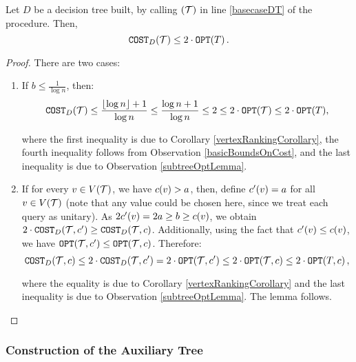 \begin{lemma}\label{baseOfRecursion}
    Let $D$ be a decision tree built, by calling \FRankingBasedDT$\mathopen{}\left( \mathcal{T} \right)$ in line \ref{basecaseDT} of the \FCreateDecisionTree procedure. Then,  
$$
\texttt{COST}_{D}\mathopen{}\left( \mathcal{T} \right)\leq 2\cdot\texttt{OPT}\mathopen{}\left( T \right).
$$
\begin{proof}
    There are two cases:
    \begin{enumerate}
        \item If $b\leq \frac{1}{\log n}$, then:
$$
\texttt{COST}_{D}\mathopen{}\left( \mathcal{T} \right)\leq\frac{\mathopen{}\left\lfloor \log n \right\rfloor+1}{\log n}\leq \frac{\log n+1}{\log n}\leq2\leq 2\cdot \texttt{OPT}(\mathcal{T})\leq 2\cdot\texttt{OPT}(T),
$$

where the first inequality is due to Corollary \ref{vertexRankingCorollary}, the fourth inequality follows from Observation \ref{basicBoundsOnCost}, and the last inequality is due to Observation \ref{subtreeOptLemma}.

        \item If for every $v\in V\mathopen{}\left( \mathcal{T} \right)$, we have $c\mathopen{}\left( v \right)> a$, then, define $c'\mathopen{}\left( v \right)=a$ for all $v\in V\mathopen{}\left( \mathcal{T} \right)$ (note that any value could be chosen here, since we treat each query as unitary). As $2c'\mathopen{}\left( v \right) = 2a\geq b \geq c\mathopen{}\left( v \right)$, we obtain $2\cdot \texttt{COST}_D\mathopen{}\left( \mathcal{T}, c' \right)\geq \texttt{COST}_D\mathopen{}\left( \mathcal{T}, c \right)$. Additionally, using the fact that $c'\mathopen{}\left( v \right) \leq c\mathopen{}\left( v \right)$, we have $\texttt{OPT}\mathopen{}\left( \mathcal{T}, c' \right)\leq \texttt{OPT}\mathopen{}\left( \mathcal{T}, c \right)$. Therefore:
$$
\texttt{COST}_D\mathopen{}\left( \mathcal{T}, c \right)\leq 2\cdot \texttt{COST}_D\mathopen{}\left( \mathcal{T}, c' \right)=2\cdot \texttt{OPT}\mathopen{}\left( \mathcal{T}, c' \right)\leq 2\cdot\texttt{OPT}\mathopen{}\left( \mathcal{T}, c \right)\leq 2\cdot\texttt{OPT}\mathopen{}\left( T, c \right),
$$

where the equality is due to Corollary \ref{vertexRankingCorollary} and the last inequality is due to Observation \ref{subtreeOptLemma}. The lemma follows.
    \end{enumerate}
\end{proof}
\end{lemma}



\subsubsection{Construction of the Auxiliary Tree}\label{auxTreeConstruction}

